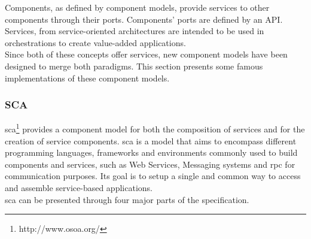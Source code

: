 Components, as defined by component models, provide services to other components through their ports. Components' ports are defined by an API. Services, from service-oriented architectures are intended to be used in orchestrations to create value-added applications.\\
Since both of these concepts offer services, new component models have been designed to merge both paradigms. This section presents some famous implementations of these component models.\\

\subsubsection{SCA}

\gls{sca}\footnote{http://www.osoa.org/} provides a component model for both the composition of services and for the creation of service components.
\gls{sca} is a model that aims to encompass different programming languages, frameworks and environments commonly used to build components and services, such as Web Services, Messaging systems and \gls{rpc} for communication purposes. Its goal is to setup a single and common way to access and assemble service-based applications.\\
\gls{sca} can be presented through four major parts of the specification.\\

